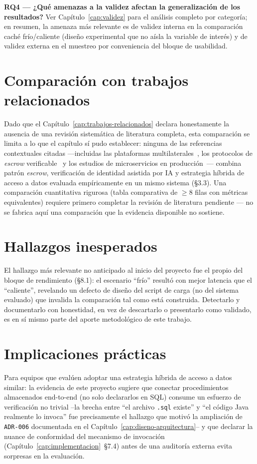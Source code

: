 \textbf{RQ4 --- ¿Qué amenazas a la validez afectan la generalización de
los resultados?} Ver Capítulo~\ref{cap:validez} para el análisis completo
por categoría; en resumen, la amenaza más relevante es de validez interna
en la comparación caché frío/caliente (diseño experimental que no aísla
la variable de interés) y de validez externa en el muestreo por
conveniencia del bloque de usabilidad.

\section{Comparación con trabajos relacionados}

Dado que el Capítulo~\ref{cap:trabajos-relacionados} declara honestamente
la ausencia de una revisión sistemática de literatura completa, esta
comparación se limita a lo que el capítulo sí pudo establecer: ninguna de
las referencias contextuales citadas ---incluidas las plataformas
multilaterales~\cite{HAGIU2015}, los protocolos de \emph{escrow}
verificable~\cite{ASGAONKAR2019} y los estudios de microservicios en
producción~\cite{WANG2021}--- combina patrón \emph{escrow}, verificación
de identidad asistida por IA y estrategia híbrida de acceso a datos
evaluada empíricamente en un mismo sistema (\S3.3). Una comparación
cuantitativa rigurosa (tabla comparativa de $\geq$8 filas con métricas
equivalentes) requiere primero completar la revisión de literatura
pendiente --- no se fabrica aquí una comparación que la evidencia
disponible no sostiene.

\section{Hallazgos inesperados}

El hallazgo más relevante no anticipado al inicio del proyecto fue el
propio del bloque de rendimiento (\S8.1): el escenario ``frío'' resultó
con mejor latencia que el ``caliente'', revelando un defecto de diseño del
script de carga (no del sistema evaluado) que invalida la comparación tal
como está construida. Detectarlo y documentarlo con honestidad, en vez de
descartarlo o presentarlo como validado, es en sí mismo parte del aporte
metodológico de este trabajo.

\section{Implicaciones prácticas}

Para equipos que evalúen adoptar una estrategia híbrida de acceso a datos
similar: la evidencia de este proyecto sugiere que conectar procedimientos
almacenados end-to-end (no solo declararlos en SQL) consume un esfuerzo
de verificación no trivial --la brecha entre ``el archivo \texttt{.sql}
existe'' y ``el código Java realmente lo invoca'' fue precisamente el
hallazgo que motivó la ampliación de \texttt{ADR-006} documentada en el
Capítulo~\ref{cap:diseno-arquitectura}-- y que declarar la nuance de
conformidad del mecanismo de invocación
(Capítulo~\ref{cap:implementacion}~\S7.4) antes de una auditoría externa
evita sorpresas en la evaluación.

